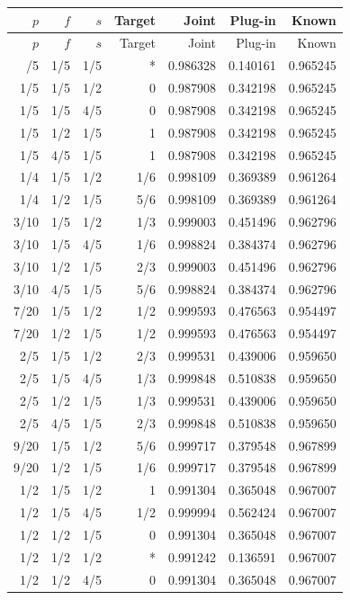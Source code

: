 \small
\begin{longtable}{rrrrrrr}
\toprule $p$ & $f$ & $s$ & Target & Joint & Plug-in & Known\\
\midrule\endfirsthead
\toprule $p$ & $f$ & $s$ & Target & Joint & Plug-in & Known\\
\midrule\endhead
\bottomrule\endfoot
1/5 & 1/5 & 1/5 & * & 0.986328 & 0.140161 & 0.965245\\
1/5 & 1/5 & 1/2 & 0 & 0.987908 & 0.342198 & 0.965245\\
1/5 & 1/5 & 4/5 & 0 & 0.987908 & 0.342198 & 0.965245\\
1/5 & 1/2 & 1/5 & 1 & 0.987908 & 0.342198 & 0.965245\\
1/5 & 4/5 & 1/5 & 1 & 0.987908 & 0.342198 & 0.965245\\
1/4 & 1/5 & 1/2 & 1/6 & 0.998109 & 0.369389 & 0.961264\\
1/4 & 1/2 & 1/5 & 5/6 & 0.998109 & 0.369389 & 0.961264\\
3/10 & 1/5 & 1/2 & 1/3 & 0.999003 & 0.451496 & 0.962796\\
3/10 & 1/5 & 4/5 & 1/6 & 0.998824 & 0.384374 & 0.962796\\
3/10 & 1/2 & 1/5 & 2/3 & 0.999003 & 0.451496 & 0.962796\\
3/10 & 4/5 & 1/5 & 5/6 & 0.998824 & 0.384374 & 0.962796\\
7/20 & 1/5 & 1/2 & 1/2 & 0.999593 & 0.476563 & 0.954497\\
7/20 & 1/2 & 1/5 & 1/2 & 0.999593 & 0.476563 & 0.954497\\
2/5 & 1/5 & 1/2 & 2/3 & 0.999531 & 0.439006 & 0.959650\\
2/5 & 1/5 & 4/5 & 1/3 & 0.999848 & 0.510838 & 0.959650\\
2/5 & 1/2 & 1/5 & 1/3 & 0.999531 & 0.439006 & 0.959650\\
2/5 & 4/5 & 1/5 & 2/3 & 0.999848 & 0.510838 & 0.959650\\
9/20 & 1/5 & 1/2 & 5/6 & 0.999717 & 0.379548 & 0.967899\\
9/20 & 1/2 & 1/5 & 1/6 & 0.999717 & 0.379548 & 0.967899\\
1/2 & 1/5 & 1/2 & 1 & 0.991304 & 0.365048 & 0.967007\\
1/2 & 1/5 & 4/5 & 1/2 & 0.999994 & 0.562424 & 0.967007\\
1/2 & 1/2 & 1/5 & 0 & 0.991304 & 0.365048 & 0.967007\\
1/2 & 1/2 & 1/2 & * & 0.991242 & 0.136591 & 0.967007\\
1/2 & 1/2 & 4/5 & 0 & 0.991304 & 0.365048 & 0.967007\\

\end{longtable}
